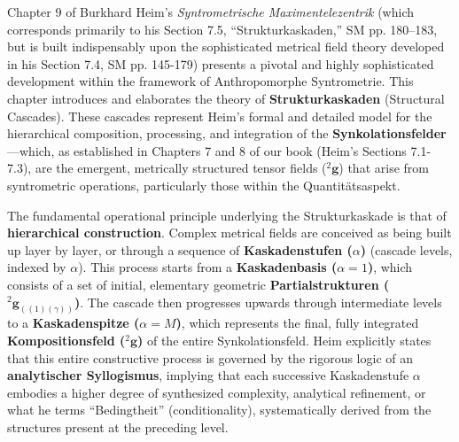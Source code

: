\documentclass[12pt]{article}
\newcommand{\q}[1]{\enquote{#1}}
\newcommand{\kompositionsfeld}{{}^2\mathbf{g}}
\newcommand{\partialstruktur}[1]{{}^2\mathbf{g}_{(#1)}} %
\newcommand{\kaskadenstufe}{\alpha}
\begin{document}
Chapter 9 of Burkhard Heim's \textit{Syntrometrische Maximentelezentrik} (which corresponds primarily to his Section 7.5, \q{Strukturkaskaden,} SM pp. 180–183, but is built indispensably upon the sophisticated metrical field theory developed in his Section 7.4, SM pp. 145-179) presents a pivotal and highly sophisticated development within the framework of Anthropomorphe Syntrometrie. This chapter introduces and elaborates the theory of \textbf{Strukturkaskaden} (Structural Cascades). These cascades represent Heim's formal and detailed model for the hierarchical composition, processing, and integration of the \textbf{Synkolationsfelder}—which, as established in Chapters 7 and 8 of our book (Heim's Sections 7.1-7.3), are the emergent, metrically structured tensor fields (\( \kompositionsfeld \)) that arise from syntrometric operations, particularly those within the Quantitätsaspekt.

The fundamental operational principle underlying the Strukturkaskade is that of \textbf{hierarchical construction}. Complex metrical fields are conceived as being built up layer by layer, or through a sequence of \textbf{Kaskadenstufen (\(\kaskadenstufe\))} (cascade levels, indexed by \( \alpha \)). This process starts from a \textbf{Kaskadenbasis (\( \kaskadenstufe=1 \))}, which consists of a set of initial, elementary geometric \textbf{Partialstrukturen (\( \partialstruktur{(1)(\gamma)} \))}. The cascade then progresses upwards through intermediate levels to a \textbf{Kaskadenspitze (\( \kaskadenstufe=M \))}, which represents the final, fully integrated \textbf{Kompositionsfeld (\( \kompositionsfeld \))} of the entire Synkolationsfeld. Heim explicitly states that this entire constructive process is governed by the rigorous logic of an \textbf{analytischer Syllogismus}, implying that each successive Kaskadenstufe \( \kaskadenstufe \) embodies a higher degree of synthesized complexity, analytical refinement, or what he terms \q{Bedingtheit} (conditionality), systematically derived from the structures present at the preceding level.
\end{document}

